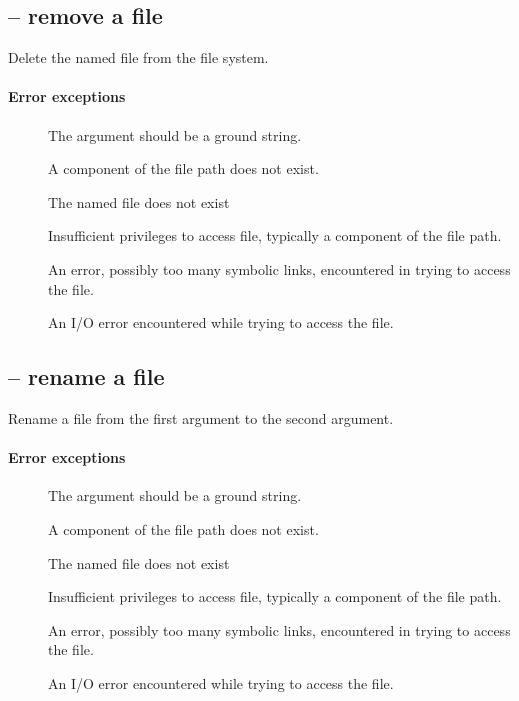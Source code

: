 \subsection{ -- remove a file}
\label{io:frm}
Delete the named file from the file system.

\paragraph{Error exceptions}
\begin{description}
\item[]
The argument should be a ground string.
\item[]
A component of the file path does not exist.
\item[]
The named file does not exist
\item[]
Insufficient privileges to access file, typically a component of the file path.
\item[]
An error, possibly too many symbolic links, encountered in trying to access the file.
\item[]
An I/O error encountered while trying to access the file.
\end{description}

\subsection{ -- rename a file}
\label{io:fmv}
Rename a file from the first argument to the second argument.

\paragraph{Error exceptions}
\begin{description}
\item[]
The argument should be a ground string.
\item[]
A component of the file path does not exist.
\item[]
The named file does not exist
\item[]
Insufficient privileges to access file, typically a component of the file path.
\item[]
An error, possibly too many symbolic links, encountered in trying to access the file.
\item[]
An I/O error encountered while trying to access the file.
\end{description}

